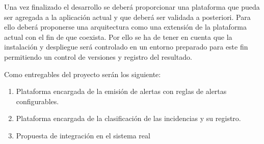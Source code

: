 Una vez finalizado el desarrollo se deberá proporcionar una plataforma que pueda ser agregada a la aplicación actual y que deberá ser validada a posteriori. Para ello deberá proponerse una arquitectura como una extensión de la plataforma actual con el fin de que coexista. Por ello se ha de tener en cuenta que la instalación y despliegue será controlado en un entorno preparado para este fin permitiendo un control de versiones y registro del resultado.

Como entregables del proyecto serán los siguiente:
\begin{enumerate}
\item Plataforma encargada de la emisión de alertas con reglas de alertas configurables.
\item Plataforma encargada de la clasificación de las incidencias y su registro.
\item Propuesta de integración en el sistema real
\end{enumerate}